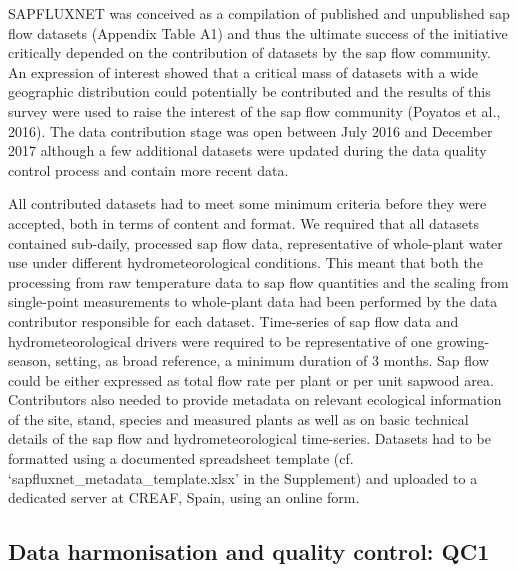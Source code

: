 \documentclass[11pt,twoside]{reedthesis}
\begin{document}
SAPFLUXNET was conceived as a compilation of published and unpublished
sap flow datasets (Appendix Table A1) and thus the ultimate success of
the initiative critically depended on the contribution of datasets by
the sap flow community. An expression of interest showed that a critical
mass of datasets with a wide geographic distribution could potentially
be contributed and the results of this survey were used to raise the
interest of the sap flow community (Poyatos et al., 2016). The data
contribution stage was open between July 2016 and December 2017 although
a few additional datasets were updated during the data quality control
process and contain more recent data. \par

All contributed datasets had to meet some minimum criteria before they
were accepted, both in terms of content and format. We required that all
datasets contained sub-daily, processed sap flow data, representative of
whole-plant water use under different hydrometeorological conditions.
This meant that both the processing from raw temperature data to sap
flow quantities and the scaling from single-point measurements to
whole-plant data had been performed by the data contributor responsible
for each dataset. Time-series of sap flow data and hydrometeorological
drivers were required to be representative of one growing-season,
setting, as broad reference, a minimum duration of 3 months. Sap flow
could be either expressed as total flow rate per plant or per unit
sapwood area. Contributors also needed to provide metadata on relevant
ecological information of the site, stand, species and measured plants
as well as on basic technical details of the sap flow and
hydrometeorological time-series. Datasets had to be formatted using a
documented spreadsheet template (cf.
`sapfluxnet\_metadata\_template.xlsx' in the Supplement) and uploaded to
a dedicated server at CREAF, Spain, using an online form.\par

\subsection{Data harmonisation and quality control:
QC1}\label{data-harmonisation-and-quality-control-qc1}
\end{document}

